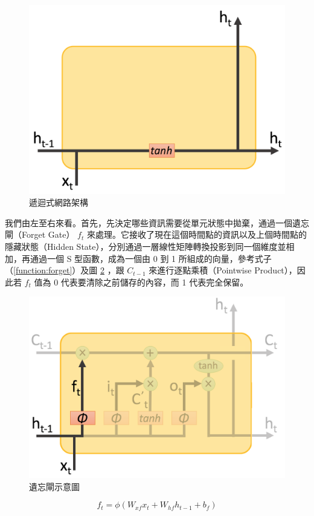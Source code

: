 \begin{figure}[h]
    \centering
    \includegraphics[scale=0.3]{images/chap2_rnnstruct.png}
    \caption{遞迴式網路架構}\label{fig:chap2_rnnA}
\end{figure}
我們由左至右來看。首先，先決定哪些資訊需要從單元狀態中拋棄，通過一個遺忘閘（Forget Gate） $f_t$ 來處理。它接收了現在這個時間點的資訊以及上個時間點的隱藏狀態（Hidden State），分別通過一層線性矩陣轉換投影到同一個維度並相加，再通過一個 S 型函數，成為一個由 0 到 1 所組成的向量，參考式子（\ref{function:forget}）及圖 \ref{fig:forget} ，跟 $C_{t-1}$ 來進行逐點乘積（Pointwise Product），因此若 $f_t$ 值為 0 代表要清除之前儲存的內容，而 1 代表完全保留。
\begin{figure}[h]
    \centering
    \includegraphics[scale=0.35]{images/chap2_forget.png}
    \caption{遺忘閘示意圖\cite{shen2016} }\label{fig:forget}
\end{figure}
\begin{equation}
    f_t = \phi(W_{xf}x_t + W_{hf}h_{t-1} + b_f) \label{function:forget}
\end{equation}


